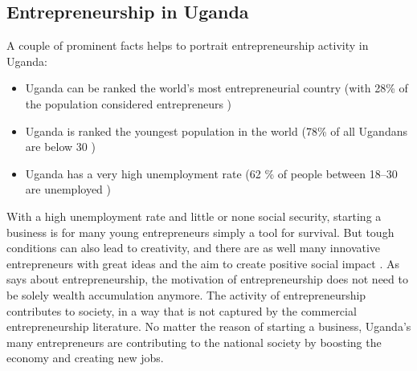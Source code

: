 \subsection{Entrepreneurship in Uganda} %


    A couple of prominent facts helps to portrait entrepreneurship activity in Uganda:

    \begin{itemize}
      \item Uganda can be ranked the world's most entrepreneurial country (with 28\% of the population considered entrepreneurs \citep{goodis})
        \item Uganda is ranked the youngest population in the world (78\% of all Ugandans are below 30 \citep{unPopulation})
        \item Uganda has a very high unemployment rate (62 \% of people between 18–30 are unemployed \citep{lostopportunity})
    \end{itemize}


    With a high unemployment rate and little or none social security, starting a business is for many young entrepreneurs simply a tool for survival. But tough conditions can also lead to creativity, and there are as well many innovative entrepreneurs with great ideas and the aim to create positive social impact \citep{nissar}. As \cite{mitchel} says about entrepreneurship, the motivation of entrepreneurship does not need to be solely wealth accumulation anymore. The activity of entrepreneurship contributes to society, in a way that is not captured by the commercial entrepreneurship literature. No matter the reason of starting a business, Uganda's many entrepreneurs are contributing to the national society by boosting the economy and creating new jobs.
